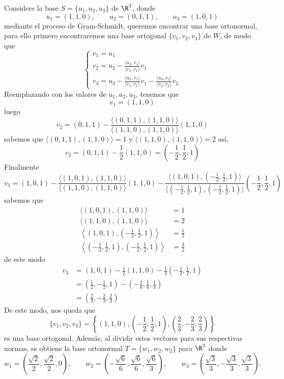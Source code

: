 \documentclass[compacto,10pt]{pubciencias-notas}
\begin{document}
\begin{ejem}
    Considere la base $S = \{u_1, u_2, u_3\}$ de $\R^3$, donde 
    \[
        u_1 = (1,1,0), \qquad u_2 = (0, 1,1), \qquad u_3 = (1,0,1)
    \]
    mediante el proceso de Gram-Schmidt, queremos encontrar una base ortonormal, para ello primero encontraremos una base ortogonal $\{v_{1}, v_{2}, v_{3}\}$  de $W$, de modo que \[
\begin{cases}
    v_1=u_1\\
    v_2=u_2-\frac{\langle u_2,v_1\rangle}{\langle v_1,v_1\rangle}v_1\\
    v_3=u_3-\frac{\langle u_3,v_1\rangle}{\langle v_1,v_1\rangle}v_1-\frac{\langle u_3,v_2\rangle}{\langle v_2,v_2\rangle}v_2
\end{cases}
\] 
Reemplazando con los valores de $u_{1}, u_{2}, u_{3}$, tenemos que 
\[
v_1=(1,1,0)
\]
luego \[
v_2=(0,1,1)-\frac{\langle (0,1,1),(1,1,0)\rangle}{\langle (1,1,0),(1,1,0)\rangle}(1,1,0)
\]
sabemos que $\langle (0,1,1),(1,1,0)\rangle=1$ y $ \langle (1,1,0),(1,1,0)\rangle=2 $ así,
\[
v_2=(0,1,1)-\frac{1}{ 2}(1,1,0)=\left(-\frac{1}{2},\frac{1}{2},1\right)
\]
Finalmente 
\[
v_3=(1,0,1)-\frac{\langle (1,0,1),(1,1,0)\rangle}{\langle (1,1,0),(1,1,0)\rangle}(1,1,0)-\frac{\langle (1,0,1),\left(-\frac{1}{2},\frac{1}{2},1\right)\rangle}{\langle \left(-\frac{1}{2},\frac{1}{2},1\right),\left(-\frac{1}{2},\frac{1}{2},1\right)\rangle}\left(-\frac{1}{2},\frac{1}{2},1\right)
\]
sabemos que 
\begin{align*}
    \langle (1,0,1),(1,1,0)\rangle&=1\\
    \langle (1,1,0),(1,1,0)\rangle&=2\\
    \left\langle (1,0,1),\left(-\frac{1}{2},\frac{1}{2},1\right)\right\rangle&=\frac{1}{2}\\
    \left\langle \left(-\frac{1}{2},\frac{1}{2},1\right),\left(-\frac{1}{2},\frac{1}{2},1\right)\right\rangle&=\frac{3}{2}
\end{align*}
de este modo
\begin{align*}
v_3&=(1,0,1)-\frac{1}{2}(1,1,0)-\frac{1}{3}\left(-\frac{1}{2},\frac{1}{2},1\right)\\
&=\left(\frac{1}{2},-\frac{1}{2},1\right)-\left(-\frac{1}{6},\frac{1}{6},\frac{1}{3}\right)\\
&=\left(\frac{2}{3},-\frac{2}{3},\frac{2}{3}\right)
\end{align*}
De este modo, nos queda que 
\[
    \{v_{1}, v_{2}, v_{3}\} = \left\{(1,1,0), \left(-\frac{1}{2},\frac{1}{2},1\right), \left(\frac{2}{3},-\frac{2}{3},\frac{2}{3}\right)\right\}
\]
es una base ortogonal. Además, al dividir estos vectores para sus respectivas normas, se obtiene la base ortonormal $T=\{w_1, w_2, w_2\}$ para $\R^3$ donde
    \[
        w_1 = \left(\dfrac{\sqrt{2}}{2},\dfrac{\sqrt{2}}{2},0\right), \qquad
        w_2 = \left(-\dfrac{\sqrt{6}}{6},\dfrac{\sqrt{6}}{6},
        \dfrac{\sqrt{6}}{3}\right), \qquad
        w_3 = \left(\dfrac{\sqrt{3}}{3},-\dfrac{\sqrt{3}}{3},
        \dfrac{\sqrt{3}}{3}\right).
    \]
\end{ejem}
\end{document}
